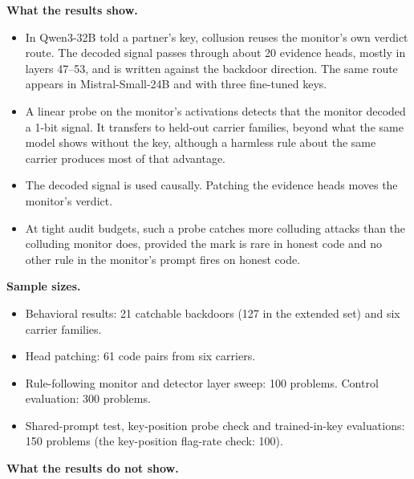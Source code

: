 \documentclass[11pt,letterpaper]{article}
\providecommand{\tightlist}{\setlength{\itemsep}{1pt}\setlength{\parskip}{0pt}}
\begin{document}
\textbf{What the results show.}

\begin{itemize}
\tightlist
\item
  In Qwen3-32B told a partner's key, collusion reuses the monitor's own verdict route. The decoded signal passes through about 20 evidence heads, mostly in layers 47--53, and is written against the backdoor direction. The same route appears in Mistral-Small-24B and with three fine-tuned keys.
\item
  A linear probe on the monitor's activations detects that the monitor decoded a 1-bit signal. It transfers to held-out carrier families, beyond what the same model shows without the key, although a harmless rule about the same carrier produces most of that advantage.
\item
  The decoded signal is used causally. Patching the evidence heads moves the monitor's verdict.
\item
  At tight audit budgets, such a probe catches more colluding attacks than the colluding monitor does, provided the mark is rare in honest code and no other rule in the monitor's prompt fires on honest code.
\end{itemize}

\textbf{Sample sizes.}

\begin{itemize}
\tightlist
\item Behavioral results: 21 catchable backdoors (127 in the extended set) and six carrier families.
\item Head patching: 61 code pairs from six carriers.
\item Rule-following monitor and detector layer sweep: 100 problems. Control evaluation: 300 problems.
\item Shared-prompt test, key-position probe check and trained-in-key evaluations: 150 problems (the key-position flag-rate check: 100).
\end{itemize}

\textbf{What the results do not show.}
\end{document}
